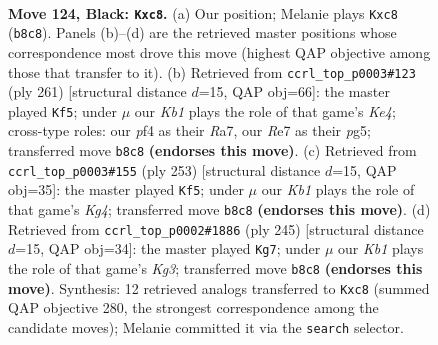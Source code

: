 \documentclass[11pt]{article}
\begin{document}
\clearpage

\begin{figure}[p]\centering
\begin{subfigure}{0.46\textwidth}\centering
\resizebox{\linewidth}{!}{%
\newchessgame
\chessboard[
  setfen={1kR5/4r3/4p3/4P3/5P1R/8/4K3/8 b - - 34 124},
  showmover=false,
  pgfstyle=straightmove, color=movearrow, markmove={b8-c8}
]}
\caption{}
\end{subfigure}\hfill
\begin{subfigure}{0.46\textwidth}\centering
\resizebox{\linewidth}{!}{%
\newchessgame
\chessboard[
  setfen={8/r7/8/4k1Pp/4R2P/4K3/8/8 b - - 68 131},
  showmover=false,
  pgfstyle=straightmove, color=movearrow, markmove={e5-f5}
]}
\caption{}
\end{subfigure}
\\[4pt]
\begin{subfigure}{0.46\textwidth}\centering
\resizebox{\linewidth}{!}{%
\newchessgame
\chessboard[
  setfen={r7/6R1/8/6k1/5p2/5P2/6PK/8 b - - 62 127},
  showmover=false,
  pgfstyle=straightmove, color=movearrow, markmove={g5-f5}
]}
\caption{}
\end{subfigure}\hfill
\begin{subfigure}{0.46\textwidth}\centering
\resizebox{\linewidth}{!}{%
\newchessgame
\chessboard[
  setfen={r7/8/4R1k1/6p1/6P1/5P2/5K2/8 b - - 12 123},
  showmover=false,
  pgfstyle=straightmove, color=movearrow, markmove={g6-g7}
]}
\caption{}
\end{subfigure}
\caption{\textbf{Move 124, Black: \texttt{Kxc8}.} (a) Our position; Melanie plays \texttt{Kxc8} (\texttt{b8c8}). Panels (b)--(d) are the retrieved master positions whose correspondence most drove this move (highest QAP objective among those that transfer to it). (b) Retrieved from \texttt{ccrl\_top\_p0003\#123} (ply 261) [structural distance $d$=15, QAP obj=66]: the master played \texttt{Kf5}; under $\mu$ our \emph{Kb1} plays the role of that game's \emph{Ke4}; cross-type roles: our \emph{p}f4 as their \emph{R}a7, our \emph{R}e7 as their \emph{p}g5; transferred move \texttt{b8c8} \textbf{(endorses this move)}. (c) Retrieved from \texttt{ccrl\_top\_p0003\#155} (ply 253) [structural distance $d$=15, QAP obj=35]: the master played \texttt{Kf5}; under $\mu$ our \emph{Kb1} plays the role of that game's \emph{Kg4}; transferred move \texttt{b8c8} \textbf{(endorses this move)}. (d) Retrieved from \texttt{ccrl\_top\_p0002\#1886} (ply 245) [structural distance $d$=15, QAP obj=34]: the master played \texttt{Kg7}; under $\mu$ our \emph{Kb1} plays the role of that game's \emph{Kg3}; transferred move \texttt{b8c8} \textbf{(endorses this move)}. Synthesis: 12 retrieved analogs transferred to \texttt{Kxc8} (summed QAP objective 280, the strongest correspondence among the candidate moves); Melanie committed it via the \texttt{search} selector.}
\label{fig:thought-m247}
\end{figure}
\end{document}
